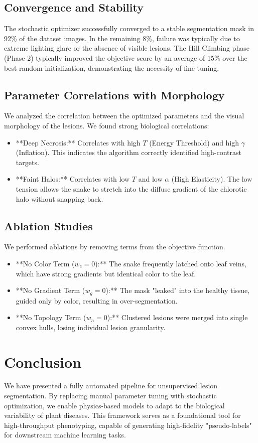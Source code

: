 \documentclass[journal]{IEEEtran}
\begin{document}
\subsection{Convergence and Stability}
The stochastic optimizer successfully converged to a stable segmentation mask in 92\% of the dataset images. In the remaining 8\%, failure was typically due to extreme lighting glare or the absence of visible lesions. The Hill Climbing phase (Phase 2) typically improved the objective score by an average of 15\% over the best random initialization, demonstrating the necessity of fine-tuning.

\subsection{Parameter Correlations with Morphology}
We analyzed the correlation between the optimized parameters and the visual morphology of the lesions. We found strong biological correlations:
\begin{itemize}
    \item **Deep Necrosis:** Correlates with high $T$ (Energy Threshold) and high $\gamma$ (Inflation). This indicates the algorithm correctly identified high-contrast targets.
    \item **Faint Halos:** Correlates with low $T$ and low $\alpha$ (High Elasticity). The low tension allows the snake to stretch into the diffuse gradient of the chlorotic halo without snapping back.
\end{itemize}

\subsection{Ablation Studies}
We performed ablations by removing terms from the objective function.
\begin{itemize}
    \item **No Color Term ($w_c = 0$):** The snake frequently latched onto leaf veins, which have strong gradients but identical color to the leaf.
    \item **No Gradient Term ($w_g = 0$):** The mask "leaked" into the healthy tissue, guided only by color, resulting in over-segmentation.
    \item **No Topology Term ($w_n = 0$):** Clustered lesions were merged into single convex hulls, losing individual lesion granularity.
\end{itemize}

\section{Conclusion}
We have presented a fully automated pipeline for unsupervised lesion segmentation. By replacing manual parameter tuning with stochastic optimization, we enable physics-based models to adapt to the biological variability of plant diseases. This framework serves as a foundational tool for high-throughput phenotyping, capable of generating high-fidelity "pseudo-labels" for downstream machine learning tasks.



\end{document}
